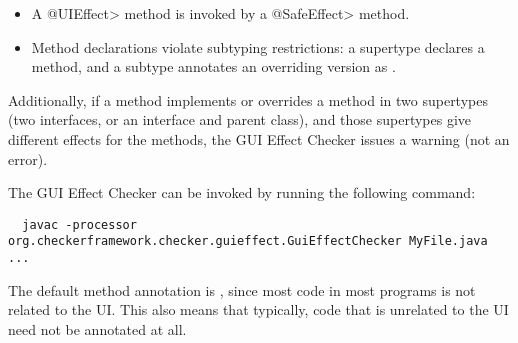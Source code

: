 \begin{itemize}
\item
  A \<@UIEffect> method is invoked by a \<@SafeEffect> method.

\item
  Method declarations violate subtyping restrictions:  a supertype declares
  a  method, and a subtype annotates an overriding
  version as .

\end{itemize}

Additionally, if a method implements or overrides a method in two
supertypes (two interfaces, or an interface and parent class), and those
supertypes give different effects for the methods, the GUI Effect Checker
issues a warning (not an error).



%



The GUI Effect Checker can be invoked by running the following command:
\begin{Verbatim}
  javac -processor org.checkerframework.checker.guieffect.GuiEffectChecker MyFile.java ...
\end{Verbatim}



The default method annotation is , since most code in most programs is not related
to the UI\@.  This also means that typically, code that is unrelated to the UI need not be annotated
at all.

